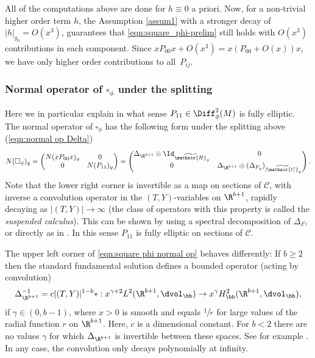 All of the computations above are done for $h\equiv 0$ a priori. Now, for
a non-trivial higher order term $h$, the Assumption \ref{assum1}
with a stronger decay of $|h|_{g_0} = O(x^3)$, guarantees that
\eqref{eqn:square_phi-prelim} still holds with $O(x^3)$ contributions in each
component. Since \eg $xP_{00}x + O(x^3) = x(P_{00}+O(x))x$,
we have only higher order contributions to all~$P_{ij}$.

\subsubsection{Normal operator of $\square_\phi$ under the splitting}
Here we in particular explain in what sense $P_{11}\in \Diff^2_\phi(M)$ is fully
elliptic. The normal operator of $\square_\phi$ has the following form
under the splitting above (\cf \eqref{eqn:normal op Delta})
\begin{equation}
\label{eqn:square phi normal op}
N(\square_\phi)_y =
\begin{pmatrix}
N(xP_{00}x)_y & 0 \\
0 & N(P_{11})_y
\end{pmatrix}
=
\begin{pmatrix}
\Delta_{\R^{b+1}} \otimes \Id_{\widetilde{\mathscr{H}}_y} & 0 \\
0 & \Delta_{\R^{b+1}} \oplus (\Delta_{F_y})_{|\widetilde{\mathscr{C}}_y}
\end{pmatrix}.
\end{equation}
Note that the lower right corner is invertible as a map on sections of $\mathscr{C}$, with inverse a convolution operator in the $(T,Y)$-variables on $\R^{b+1}$, rapidly decaying as \hbox{$|(T,Y)|\!\to\!\infty$} (the class of operators with this property is called the \textit{suspended calculus}). This can be shown by using a spectral decomposition of $\Delta_F$, or directly as in \cite[Prop.\,2.3]{grieser-para}.
In this sense $P_{11}$ is fully elliptic on sections of $\mathscr{C}$.

The upper left corner of \eqref{eqn:square phi normal op} behaves differently:
If $b\geq2$ then the standard fundamental solution defines a bounded operator
(acting by convolution)
\begin{equation}
\label{eqn:inverse Delta}
\Delta_{\R^{b+1}}^{-1} = c|(T,Y)|^{1-b}* : x^{\gamma+2}
L^2(\R^{b+1},\dvol_\bb) \to x^{\gamma} H^2_\bb(\R^{b+1},\dvol_\bb),
\end{equation}
if $\gamma\in(0,b-1)$, where $x>0$ is smooth and equals $\sfrac1r$ for large values of the
radial function $r$ on $\R^{b+1}$. Here, $c$ is a dimensional constant. For $b<2$ there are no values $\gamma$ for
which $\Delta_{\R^{b+1}}$ is invertible between these spaces. See for example
\cite[Prop.\,A.2]{AlbRocShe:RHKTDFC}.
In any case, the convolution only decays polynomially at infinity.

